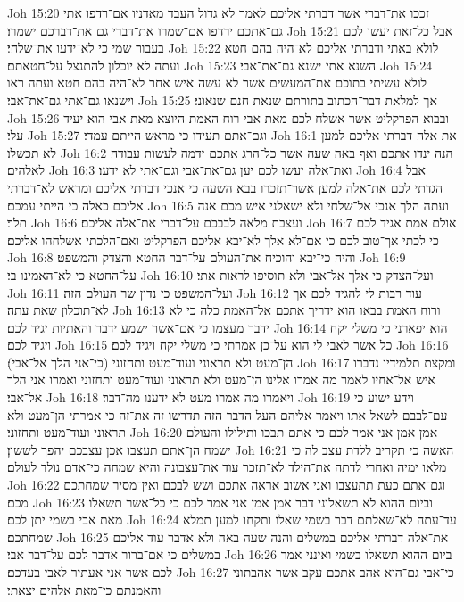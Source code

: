 Joh 15:20  זככו את־דברי אשר דברתי אליכם לאמר לא גדול העבד מאדניו אם־רדפו אתי גם־אתכם ירדפו אם־שמרו את־דברי גם את־דברכם ישמרו׃
Joh 15:21  אבל כל־זאת יעשו לכם בעבור שמי כי לא־ידעו את־שלחי׃
Joh 15:22  לולא באתי ודברתי אליכם לא־היה בהם חטא ועתה לא יוכלון להתנצל על־חטאתם׃
Joh 15:23  השנא אתי ישנא גם־את־אבי׃
Joh 15:24  לולא עשיתי בתוכם את־המעשים אשר לא עשה איש אחר לא־היה בהם חטא ועתה ראו וישנאו גם־אתי גם־את־אבי׃
Joh 15:25  אך למלאת דבר־הכתוב בתורתם שנאת חנם שנאוני׃
Joh 15:26  ובבוא הפרקליט אשר אשלח לכם מאת אבי רוח האמת היוצא מאת אבי הוא יעיד עלי׃
Joh 15:27  וגם־אתם תעידו כי מראש הייתם עמדי׃
Joh 16:1  את אלה דברתי אליכם למען לא תכשלו׃
Joh 16:2  הנה ינדו אתכם ואף באה שעה אשר כל־הרג אתכם ידמה לעשות עבודה לאלהים׃
Joh 16:3  ואת־אלה יעשו לכם יען גם־את־אבי וגם־אתי לא ידעו׃
Joh 16:4  אבל הגדתי לכם את־אלה למען אשר־תזכרו בבא השעה כי אנכי דברתי אליכם ומראש לא־דברתי אליכם כאלה כי הייתי עמכם׃
Joh 16:5  ועתה הלך אנכי אל־שלחי ולא ישאלני איש מכם אנה תלך׃
Joh 16:6  ועצבת מלאה לבבכם על־דברי את־אלה אליכם׃
Joh 16:7  אולם אמת אגיד לכם כי לכתי אך־טוב לכם כי אם־לא אלך לא־יבא אליכם הפרקליט ואם־הלכתי אשלחהו אליכם׃
Joh 16:8  והיה כי־יבא והוכיח את־העולם על־דבר החטא והצדק והמשפט׃
Joh 16:9  על־החטא כי לא־האמינו בי׃
Joh 16:10  ועל־הצדק כי אלך אל־אבי ולא תוסיפו לראות אתי׃
Joh 16:11  ועל־המשפט כי נדון שר העולם הזה׃
Joh 16:12  עוד רבות לי להגיד לכם אך לא־תוכלון שאת עתה׃
Joh 16:13  ורוח האמת בבאו הוא ידריך אתכם אל־האמת כלה כי לא ידבר מעצמו כי אם־אשר ישמע ידבר והאתיות יגיד לכם׃
Joh 16:14  הוא יפארני כי משלי יקח ויגיד לכם׃
Joh 16:15  כל אשר לאבי לי הוא על־כן אמרתי כי משלי יקח ויגיד לכם׃
Joh 16:16  הן־מעט ולא תראוני ועוד־מעט ותחזוני (כי־אני הלך אל־אבי)׃
Joh 16:17  ומקצת תלמידיו נדברו איש אל־אחיו לאמר מה אמרו אלינו הן־מעט ולא תראוני ועוד־מעט ותחזוני ואמרו אני הלך אל־אבי׃
Joh 16:18  ויאמרו מה אמרו מעט לא ידענו מה־דבר׃
Joh 16:19  וידע ישוע כי עם־לבבם לשאל אתו ויאמר אליהם העל הדבר הזה תדרשו זה את־זה כי אמרתי הן־מעט ולא תראוני ועוד־מעט ותחזוני׃
Joh 16:20  אמן אמן אני אמר לכם כי אתם תבכו ותילילו והעולם ישמח הן־אתם תעצבו אכן עצבכם יהפך לששון׃
Joh 16:21  האשה כי תקריב ללדת עצב לה כי מלאו ימיה ואחרי לדתה את־הילד לא־תזכר עוד את־עצבונה והיא שמחה כי־אדם נולד לעולם׃
Joh 16:22  וגם־אתם כעת תתעצבו ואני אשוב אראה אתכם ושש לבכם ואין־מסיר שמחתכם מכם׃
Joh 16:23  וביום ההוא לא תשאלוני דבר אמן אמן אני אמר לכם כי כל־אשר תשאלו מאת אבי בשמי יתן לכם׃
Joh 16:24  עד־עתה לא־שאלתם דבר בשמי שאלו ותקחו למען תמלא שמחתכם׃
Joh 16:25  את־אלה דברתי אליכם במשלים והנה שעה באה ולא אדבר עוד אליכם במשלים כי אם־ברור אדבר לכם על־דבר אבי׃
Joh 16:26  ביום ההוא תשאלו בשמי ואינני אמר לכם אשר אני אעתיר לאבי בעדכם׃
Joh 16:27  כי־אבי גם־הוא אהב אתכם עקב אשר אהבתוני והאמנתם כי־מאת אלהים יצאתי׃
